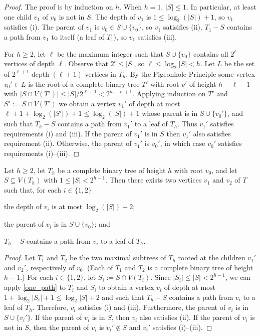 \documentclass{patmorin}
\begin{document}
\begin{proof}
  The proof is by induction on $h$.  When $h=1$, $|S|\le 1$. In particular, at least one child $v_1$ of $v_0$ is not in $S$.  The depth of $v_1$ is $1\le \log_2(|S|)+1$, so $v_1$ satisfies (i).  The parent of $v_1$ is $v_0\in S\cup\{v_0\}$, so $v_1$ satisifies (ii).  $T_1-S$ contains a path from $v_1$ to itself (a leaf of $T_1$), so $v_1$ satisfies (iii).

  For $h\ge 2$, let $\ell$ be the maximum integer such that $S\cup\{v_0\}$ contains all $2^\ell$ vertices of depth $\ell$.  Observe that $2^\ell \le |S|$, so $\ell \le \log_2 |S| < h$.  Let $L$ be the set of $2^{\ell+1}$ depth-$(\ell+1)$ vertices in $T_h$.  By the Pigeonhole Principle some vertex $v_0'\in L$ is the root of a complete binary tree $T'$ with root $v'$ of height $h-\ell-1$ with $|S\cap V(T')| \le |S|/2^{\ell+1} < 2^{h-\ell+1}$.  Applying induction on $T'$ and $S':=S\cap V(T')$ we obtain a vertex $v_1'$ of depth at most $\ell+1+\log_2(|S'|)+1 \le \log_2(|S|)+1$ whose parent is in $S\cup\{v_0'\}$, and such that $T_h-S$ contains a path from $v_1'$ to a leaf of $T_h$.  Thus $v_1'$ satisfies requirements (i) and (iii).  If the parent of $v_1'$ is in $S$ then $v_1'$ also satisfies requirement (ii).  Otherwise, the parent of $v_1'$ is $v_0'$, in which case $v_0'$ satisfies requirements (i)--(iii).
\end{proof}

\begin{lem}\label{two_paths}
  Let $h\ge 2$, let $T_h$ be a complete binary tree of height $h$ with root $v_0$, and let $S\subseteq V(T_h)$ with $1\le |S|< 2^{h-1}$. Then there exists two vertices $v_1$ and $v_2$ of $T$ such that, for each $i\in\{1,2\}$ 
  \begin{compactenum}[(i)]
    \item the depth of $v_i$ is at most $\log_2(|S|)+2$;
    \item the parent of $v_i$ is in $S\cup\{v_0\}$; and
    \item $T_h-S$ contains a path from $v_i$ to a leaf of $T_h$.
  \end{compactenum} 
\end{lem}

\begin{proof}
  Let $T_1$ and $T_2$ be the two maximal subtrees of $T_h$ rooted at the children $v_1'$ and $v_2'$, respectively of $v_0$. (Each of $T_1$ and $T_2$ is a complete binary tree of height $h-1$.)  For each $i\in\{1,2\}$, let $S_i:=S\cap V(T_i)$.  Since $|S_i|\le |S|< 2^{h-1}$, we can apply \cref{one_path} to $T_i$ and $S_i$ to obtain a vertex $v_i$ of depth at most $1+\log_2|S_i|+1 \le \log_2 |S| + 2$ and such that $T_h-S$ contains a path from $v_i$ to a leaf of $T_h$.  Therefore, $v_i$ satisfies (i) and (iii).  Furthermore, the parent of $v_i$ is in $S\cup\{v_i'\}$.  If the parent of $v_i$ is in $S$, then $v_i$ also satisfies (ii).  If the parent of $v_i$ is not in $S$, then the parent of $v_i$ is $v_i'\not\in S$ and $v_i'$ satisfies (i)--(iii).
\end{proof}
\end{document}
